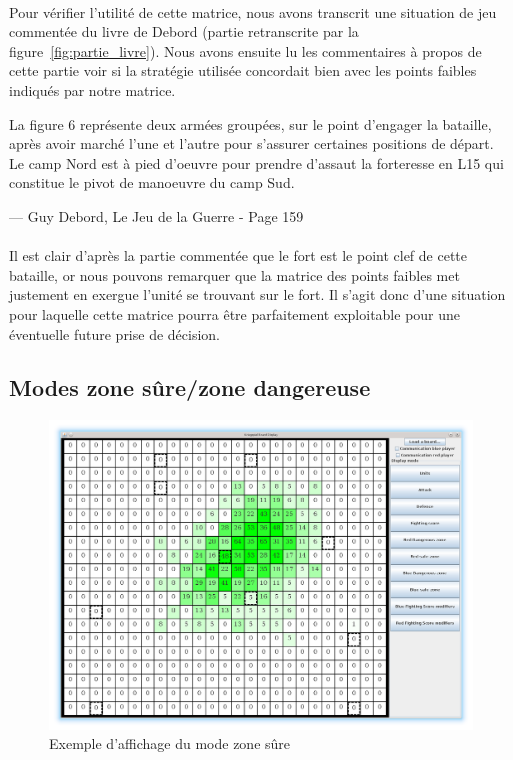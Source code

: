 			\paragraph{}
			Pour vérifier l'utilité de cette matrice, nous avons transcrit une situation de jeu commentée du livre de Debord \cite{ref2} (partie retranscrite
			par la figure~\ref{fig:partie_livre}). Nous avons ensuite lu les commentaires à propos de cette partie voir si la stratégie utilisée concordait bien
			avec les points faibles indiqués par notre matrice.

			\epigraph{La figure 6 représente deux armées groupées, sur le point d'engager la bataille, après avoir marché l'une et l'autre pour s'assurer certaines positions
			de départ. Le camp Nord est à pied d'oeuvre pour prendre d'assaut la forteresse en L15 qui constitue le pivot de manoeuvre du camp Sud.}{--- \textup{Guy Debord}, Le Jeu de la Guerre - Page 159}
						
			\paragraph{}
			Il est clair d'après la partie commentée que le fort est le point clef de cette bataille, or nous pouvons remarquer que la matrice des points faibles
			met justement en exergue l'unité se trouvant sur le fort. Il s'agit donc d'une situation pour laquelle cette matrice pourra être parfaitement exploitable
			pour une éventuelle future prise de décision.	
			
			\clearpage	

		\subsection{Modes zone sûre/zone dangereuse}
			\begin{figure}[!h]
				\centerline{\includegraphics[scale=0.4]{images/screen_safe.png}}
				\caption{Exemple d'affichage du mode zone sûre}
			\end{figure}

